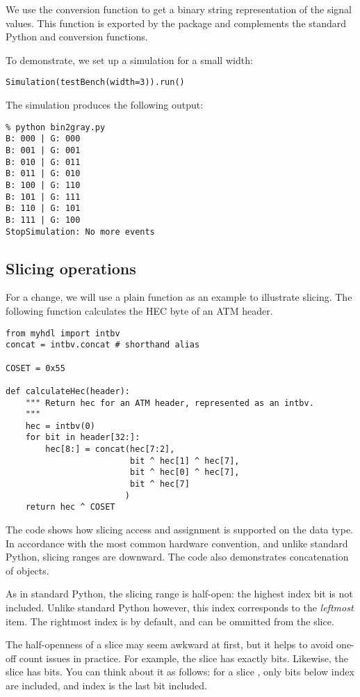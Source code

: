 We use the conversion function  to get a binary
string representation of the signal values. This function is exported
by the  package and complements the standard Python
 and  conversion functions.

To demonstrate, we set up a simulation for a small width: 

\begin{verbatim}
Simulation(testBench(width=3)).run()

\end{verbatim}

The simulation produces the following output:

\begin{verbatim}
% python bin2gray.py
B: 000 | G: 000
B: 001 | G: 001
B: 010 | G: 011
B: 011 | G: 010
B: 100 | G: 110
B: 101 | G: 111
B: 110 | G: 101
B: 111 | G: 100
StopSimulation: No more events

\end{verbatim}

\subsection{Slicing operations}

For a change, we will use a plain function as an example to illustrate
slicing.  The following function calculates the HEC byte of an ATM
header.

\begin{verbatim}
from myhdl import intbv
concat = intbv.concat # shorthand alias

COSET = 0x55

def calculateHec(header):
    """ Return hec for an ATM header, represented as an intbv.
    """
    hec = intbv(0)
    for bit in header[32:]:
        hec[8:] = concat(hec[7:2],
                         bit ^ hec[1] ^ hec[7],
                         bit ^ hec[0] ^ hec[7],
                         bit ^ hec[7]
                        )
    return hec ^ COSET

\end{verbatim}

The code shows how slicing access and assignment is supported on the
 data type. In accordance with the most common hardware
convention, and unlike standard Python, slicing ranges are
downward. The code also demonstrates concatenation of 
objects.

As in standard Python, the slicing range is half-open: the highest
index bit is not included. Unlike standard Python however, this index
corresponds to the \emph{leftmost} item. The rightmost index is
 by default, and can be ommitted from the slice.

The half-openness of a slice may seem awkward at first, but it helps
to avoid one-off count issues in practice. For example, the slice
 has exactly  bits. Likewise, the slice
 has  bits. You can think about it as
follows: for a slice \code{[i:j]}, only bits below index  are
included, and index  is the last bit included.


